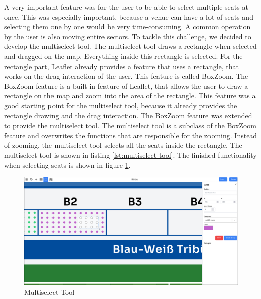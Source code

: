 A very important feature was for the user to be able to select multiple seats at once. This was especially important, because a venue can have a lot of seats and selecting them one by one would be very time-consuming. A common operation by the user is also moving entire sectors. To tackle this challenge, we decided to develop the multiselect tool. The multiselect tool draws a rectangle when selected and dragged on the map. Everything inside this rectangle is selected. For the rectangle part, Leaflet already provides a feature that uses a rectangle, that works on the drag interaction of the user. This feature is called BoxZoom. The BoxZoom feature is a built-in feature of Leaflet, that allows the user to draw a rectangle on the map and zoom into the area of the rectangle. This feature was a good starting point for the multiselect tool, because it already provides the rectangle drawing and the drag interaction. The BoxZoom feature was extended to provide the multiselect tool. The multiselect tool is a subclass of the BoxZoom feature and overwrites the functions that are responsible for the zooming. Instead of zooming, the multiselect tool selects all the seats inside the rectangle. The multiselect tool is shown in listing \ref{lst:multiselect-tool}. The finished functionality when selecting seats is shown in figure \ref{fig:multiselect-tool}.

\begin{figure}
    \centering
    \includegraphics[scale=0.22]{pics/multiselect.png}
    \caption{Multiselect Tool}
    \label{fig:multiselect-tool}
\end{figure}

